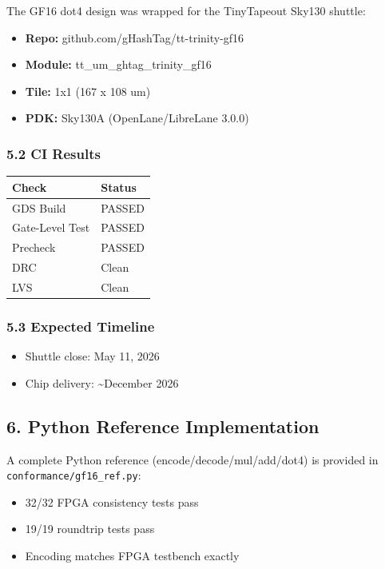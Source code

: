 \documentclass[
]{article}
\newcounter{none} %
\providecommand{\tightlist}{%
  \setlength{\itemsep}{0pt}\setlength{\parskip}{0pt}}
\begin{document}
The GF16 dot4 design was wrapped for the TinyTapeout Sky130 shuttle:

\begin{itemize}
\tightlist
\item
  \textbf{Repo:} github.com/gHashTag/tt-trinity-gf16
\item
  \textbf{Module:} tt\_um\_ghtag\_trinity\_gf16
\item
  \textbf{Tile:} 1x1 (167 x 108 um)
\item
  \textbf{PDK:} Sky130A (OpenLane/LibreLane 3.0.0)
\end{itemize}

\subsubsection{5.2 CI Results}\label{ci-results}

{\def\LTcaptype{none} %
\begin{longtable}[]{@{}ll@{}}
\toprule\noalign{}
Check & Status \\
\midrule\noalign{}
\endhead
\bottomrule\noalign{}
\endlastfoot
GDS Build & PASSED \\
Gate-Level Test & PASSED \\
Precheck & PASSED \\
DRC & Clean \\
LVS & Clean \\
\end{longtable}
}

\subsubsection{5.3 Expected Timeline}\label{expected-timeline}

\begin{itemize}
\tightlist
\item
  Shuttle close: May 11, 2026
\item
  Chip delivery: \textasciitilde December 2026
\end{itemize}

\subsection{6. Python Reference
Implementation}\label{python-reference-implementation}

A complete Python reference (encode/decode/mul/add/dot4) is provided in
\texttt{conformance/gf16\_ref.py}:

\begin{itemize}
\tightlist
\item
  32/32 FPGA consistency tests pass
\item
  19/19 roundtrip tests pass
\item
  Encoding matches FPGA testbench exactly
\end{itemize}
\end{document}
